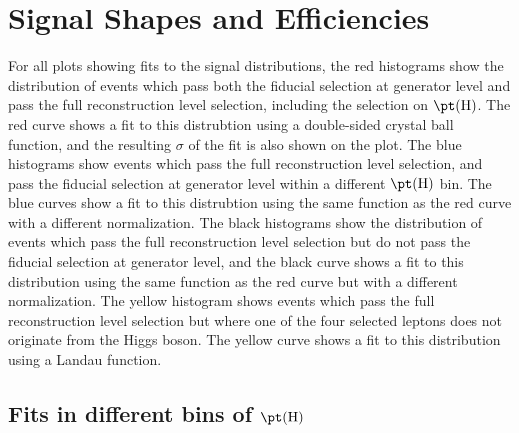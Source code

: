 \section{Signal Shapes and Efficiencies}
\label{signalinputs}
 For all plots showing fits to the signal distributions, the red histograms show the distribution of events which pass both the fiducial selection at generator level and pass the full reconstruction level selection, including the selection on $\pt(\mathrm{H})$. The red curve shows a fit to this distrubtion using a double-sided crystal ball function, and the resulting $\sigma$ of the fit is also shown on the plot. The blue histograms show events which pass the full reconstruction level selection, and pass the fiducial selection at generator level within a different $\pt(\mathrm{H})$ bin. The blue curves show a fit to this distrubtion using the same function as the red curve with a different normalization. The black histograms show the distribution of events which pass the full reconstruction level selection but do not pass the fiducial selection at generator level, and the black curve shows a fit to this distribution using the same function as the red curve but with a different normalization. The yellow histogram shows events which pass the full reconstruction level selection but where one of the four selected leptons does not originate from the Higgs boson. The yellow curve shows a fit to this distribution using a Landau function.
 
\subsection[Differential bins - Higgs boson transverse momentum]{Fits in different bins of $\pt(\mathrm{H})$ }

